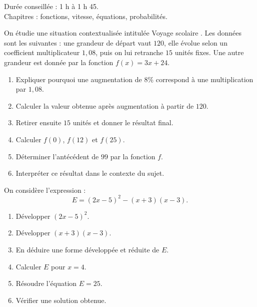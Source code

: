\documentclass[11pt,a4paper]{article}
\newcounter{exercice}
\begin{document}
\begin{objectif}
Durée conseillée : 1 h à 1 h 45.\\
Chapitres : fonctions, vitesse, équations, probabilités.
\end{objectif}
\begin{exercice}
On étudie une situation contextualisée intitulée \og Voyage scolaire \fg. Les données sont les suivantes : une grandeur de départ vaut $120$, elle évolue selon un coefficient multiplicateur $1{,}08$, puis on lui retranche $15$ unités fixes. Une autre grandeur est donnée par la fonction $f(x)=3x+24$.
\begin{enumerate}
  \item Expliquer pourquoi une augmentation de $8\%$ correspond à une multiplication par $1{,}08$.
  \item Calculer la valeur obtenue après augmentation à partir de $120$.
  \item Retirer ensuite $15$ unités et donner le résultat final.
  \item Calculer $f(0)$, $f(12)$ et $f(25)$.
  \item Déterminer l'antécédent de $99$ par la fonction $f$.
  \item Interpréter ce résultat dans le contexte du sujet.
\end{enumerate}
\end{exercice}

\begin{exercice}
On considère l'expression :
\[
E=(2x-5)^2-(x+3)(x-3).
\]
\begin{enumerate}
  \item Développer $(2x-5)^2$.
  \item Développer $(x+3)(x-3)$.
  \item En déduire une forme développée et réduite de $E$.
  \item Calculer $E$ pour $x=4$.
  \item Résoudre l'équation $E=25$.
  \item Vérifier une solution obtenue.
\end{enumerate}
\end{exercice}
\end{document}
